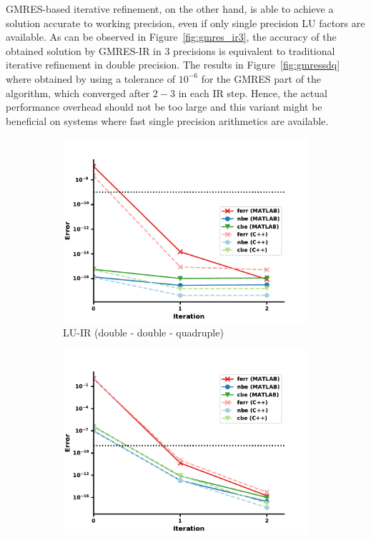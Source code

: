 GMRES-based iterative refinement, on the other hand, is able to achieve a solution accurate to working precision, even if only single precision LU factors are available. As can be observed in Figure~\hyperref[fig:gmres_ir3]{\ref{fig:gmres_ir3}}, the accuracy of the obtained solution by GMRES-IR in 3 precisions is equivalent to traditional iterative refinement in double precision. The results in Figure~\hyperref[fig:gmressdq]{\ref{fig:gmressdq}} where obtained by using a tolerance of $10^{-6}$ for the GMRES part of the algorithm, which converged after $2-3$ in each IR step. Hence, the actual performance overhead should not be too large and this variant might be beneficial on systems where fast single precision arithmetics are available.

\begin{figure}
\centering
\begin{subfigure}{.5\textwidth}
  \centering
  \includegraphics[width=\linewidth]{chapters/5_experiments/figures/LUddq.pdf}
  \caption{LU-IR (double - double - quadruple)}
  \label{fig:luddq}
\end{subfigure}%
\begin{subfigure}{.5\textwidth}
  \centering
  \includegraphics[width=\linewidth]{chapters/5_experiments/figures/GMRESsdq.pdf}

\end{subfigure}
\end{figure}
